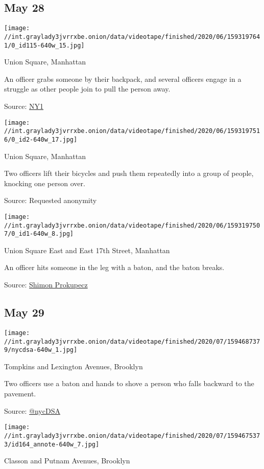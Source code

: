 \hypertarget{may-28}{%
\subsection{May 28}\label{may-28}}

\texttt{[image: //int.graylady3jvrrxbe.onion/data/videotape/finished/2020/06/1593197641/0\_id115-640w\_15.jpg]}

 Union Square, Manhattan

 An officer grabs someone by their backpack, and several officers engage
in a struggle as other people join to pull the person away.

Source: \href{https://twitter.com/NY1/status/1266159669262893057}{NY1}

\texttt{[image: //int.graylady3jvrrxbe.onion/data/videotape/finished/2020/06/1593197516/0\_id2-640w\_17.jpg]}

 Union Square, Manhattan

 Two officers lift their bicycles and push them repeatedly into a group
of people, knocking one person over.

Source: Requested anonymity

\texttt{[image: //int.graylady3jvrrxbe.onion/data/videotape/finished/2020/06/1593197507/0\_id1-640w\_8.jpg]}

 Union Square East and East 17th Street, Manhattan

 An officer hits someone in the leg with a baton, and the baton breaks.

Source:
\href{https://twitter.com/ShimonPro/status/1266136557871869952}{Shimon
Prokupecz}

\hypertarget{may-29}{%
\subsection{May 29}\label{may-29}}

\texttt{[image: //int.graylady3jvrrxbe.onion/data/videotape/finished/2020/07/1594687379/nycdsa-640w\_1.jpg]}

 Tompkins and Lexington Avenues, Brooklyn

 Two officers use a baton and hands to shove a person who falls backward
to the pavement.

Source:
\href{https://twitter.com/nycDSA/status/1266562453686665217}{@nycDSA}

\texttt{[image: //int.graylady3jvrrxbe.onion/data/videotape/finished/2020/07/1594675373/id164\_annote-640w\_7.jpg]}

 Classon and Putnam Avenues, Brooklyn

